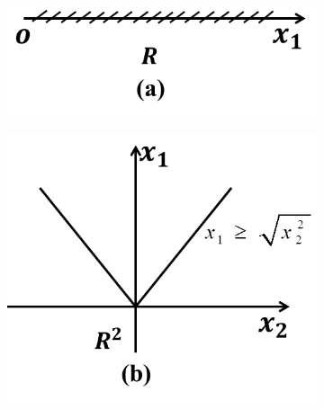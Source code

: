                 \begin{figure}[H]
                \centering
                \begin{subfigure}[b]{0.3\textwidth}
                \includegraphics[width=\textwidth]{images/Three_dimensional_2order_cone1.jpg}
                \end{subfigure}
                \begin{subfigure}[b]{0.3\textwidth}
                \includegraphics[width=\textwidth]{images/Three_dimensional_2order_cone2.jpg}
                \end{subfigure}
                \begin{subfigure}[b]{0.3\textwidth}

\end{subfigure}
\end{figure}
